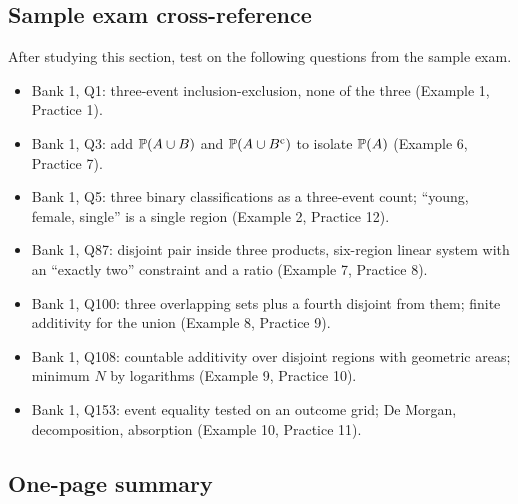 \subsection{Sample exam cross-reference}

After studying this section, test on the following questions from the sample exam.
\begin{itemize}[nosep]
  \item Bank 1, Q1: three-event inclusion-exclusion, none of the three (Example 1, Practice 1).
  \item Bank 1, Q3: add $\mathbb{P}(A \cup B)$ and $\mathbb{P}(A \cup B^{\mathrm{c}})$ to isolate $\mathbb{P}(A)$ (Example 6, Practice 7).
  \item Bank 1, Q5: three binary classifications as a three-event count; ``young, female, single'' is a single region (Example 2, Practice 12).
  \item Bank 1, Q87: disjoint pair inside three products, six-region linear system with an ``exactly two'' constraint and a ratio (Example 7, Practice 8).
  \item Bank 1, Q100: three overlapping sets plus a fourth disjoint from them; finite additivity for the union (Example 8, Practice 9).
  \item Bank 1, Q108: countable additivity over disjoint regions with geometric areas; minimum $N$ by logarithms (Example 9, Practice 10).
  \item Bank 1, Q153: event equality tested on an outcome grid; De Morgan, decomposition, absorption (Example 10, Practice 11).
\end{itemize}

\subsection{One-page summary}


